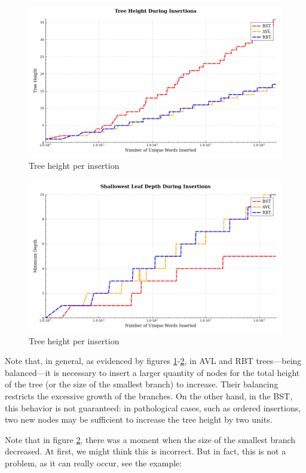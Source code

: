  \begin{figure}[H]
     \centering
     \includegraphics[width=0.75\linewidth]{img/Graph_1_20273.pdf}
     \caption{Tree height per insertion}
     \label{fig:maiorgalho}
 \end{figure}

 \begin{figure}[H]
     \centering
     \includegraphics[width=0.75\linewidth]{img/Graph_2_20273.pdf}
     \caption{Tree height per insertion}
     \label{fig:menorgalho}
 \end{figure}

 Note that, in general, as evidenced by figures \ref{fig:maiorgalho}-\ref{fig:menorgalho}, in AVL and RBT trees—being balanced—it is necessary to insert a larger quantity
 of nodes for the total height of the tree (or the size of the smallest branch) to increase. Their balancing restricts the excessive growth of the branches.
 On the other hand, in the BST, this behavior is not guaranteed: in pathological cases, such as ordered insertions,
 two new nodes may be sufficient to increase the tree height by two units.

 Note that in figure \ref{fig:menorgalho}, there was a moment when the size of the smallest branch decreased. At first,
 we might think this is incorrect. But in fact, this is not a problem,
 as it can really occur, see the example:

